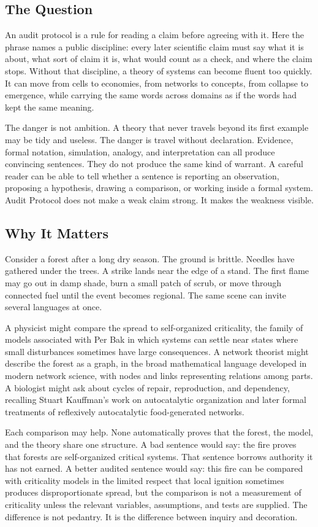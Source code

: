 \documentclass[11pt,a4paper,openany]{book}
\begin{document}
\subsection{The Question}
An audit protocol is a rule for reading a claim before agreeing with it. Here the phrase names a public discipline: every later scientific claim must say what it is about, what sort of claim it is, what would count as a check, and where the claim stops. Without that discipline, a theory of systems can become fluent too quickly. It can move from cells to economies, from networks to concepts, from collapse to emergence, while carrying the same words across domains as if the words had kept the same meaning. \cite{kauffman_autocatalytic,raf_networks}\par
The danger is not ambition. A theory that never travels beyond its first example may be tidy and useless. The danger is travel without declaration. Evidence, formal notation, simulation, analogy, and interpretation can all produce convincing sentences. They do not produce the same kind of warrant. A careful reader can be able to tell whether a sentence is reporting an observation, proposing a hypothesis, drawing a comparison, or working inside a formal system. Audit Protocol does not make a weak claim strong. It makes the weakness visible.\par
\subsection{Why It Matters}
Consider a forest after a long dry season. The ground is brittle. Needles have gathered under the trees. A strike lands near the edge of a stand. The first flame may go out in damp shade, burn a small patch of scrub, or move through connected fuel until the event becomes regional. The same scene can invite several languages at once. \cite{kauffman_autocatalytic,raf_networks}\par
A physicist might compare the spread to self-organized criticality, the family of models associated with Per Bak in which systems can settle near states where small disturbances sometimes have large consequences. A network theorist might describe the forest as a graph, in the broad mathematical language developed in modern network science, with nodes and links representing relations among parts. A biologist might ask about cycles of repair, reproduction, and dependency, recalling Stuart Kauffman's work on autocatalytic organization and later formal treatments of reflexively autocatalytic food-generated networks.\par
Each comparison may help. None automatically proves that the forest, the model, and the theory share one structure. A bad sentence would say: the fire proves that forests are self-organized critical systems. That sentence borrows authority it has not earned. A better audited sentence would say: this fire can be compared with criticality models in the limited respect that local ignition sometimes produces disproportionate spread, but the comparison is not a measurement of criticality unless the relevant variables, assumptions, and tests are supplied. The difference is not pedantry. It is the difference between inquiry and decoration.\par
\end{document}

